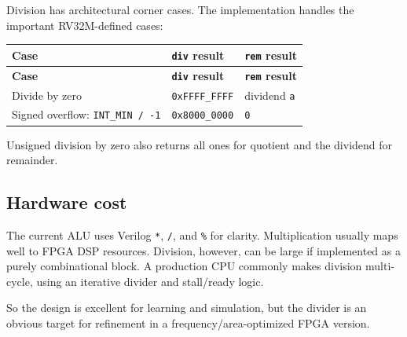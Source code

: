 Division has architectural corner cases. The implementation handles the important RV32M-defined cases:

\begin{longtable}{|>{\RaggedRight\arraybackslash}p{}|>{\RaggedRight\arraybackslash}p{}|>{\RaggedRight\arraybackslash}p{}|}
\hline
\textbf{Case} & \textbf{\texttt{div} result} & \textbf{\texttt{rem} result} \\
\hline
\endfirsthead
\hline
\textbf{Case} & \textbf{\texttt{div} result} & \textbf{\texttt{rem} result} \\
\hline
\endhead
Divide by zero & \texttt{0xFFFF\_FFFF} & dividend \texttt{a} \\
\hline
Signed overflow: \texttt{INT\_MIN / -1} & \texttt{0x8000\_0000} & \texttt{0} \\
\hline
\end{longtable}

Unsigned division by zero also returns all ones for quotient and the dividend for remainder.

\subsection{Hardware cost}

The current ALU uses Verilog \texttt{*}, \texttt{/}, and \texttt{\%} for clarity. Multiplication usually maps well to FPGA DSP resources. Division, however, can be large if implemented as a purely combinational block. A production CPU commonly makes division multi-cycle, using an iterative divider and stall/ready logic.

So the design is excellent for learning and simulation, but the divider is an obvious target for refinement in a frequency/area-optimized FPGA version.

\bigskip
